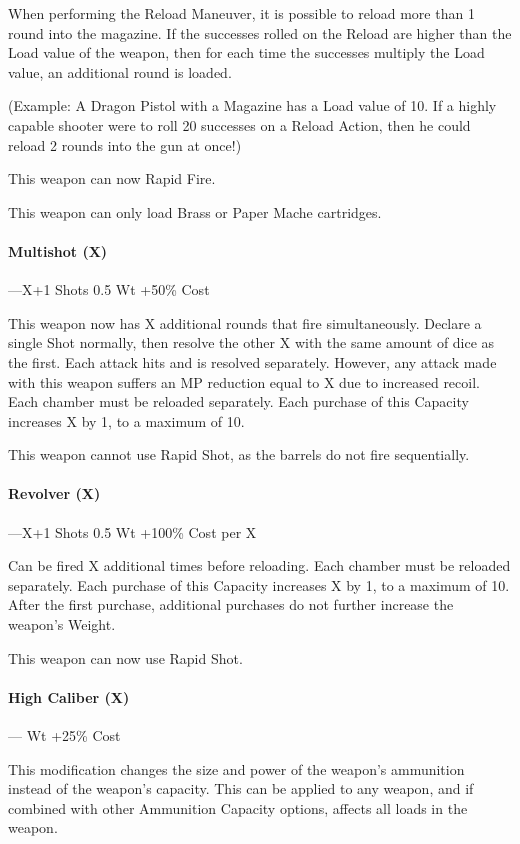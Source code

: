 \documentclass[oneside,11pt,english]{book}
\begin{document}
When performing the Reload Maneuver, it is possible to reload more than 1 round into the magazine. If the successes rolled on the Reload are higher than the Load value of the weapon, then for each time the successes multiply the Load value, an additional round is loaded.

(Example: A Dragon Pistol with a Magazine has a Load value of 10. If a highly capable shooter were to roll 20 successes on a Reload Action, then he could reload 2 rounds into the gun at once!)

This weapon can now Rapid Fire.

This weapon can only load Brass or Paper Mache cartridges.

\paragraph{Multishot (X)}---\quad X+1 Shots 0.5 Wt +50\% Cost

This weapon now has X additional rounds that fire simultaneously. Declare a single Shot normally, then resolve the other X with the same amount of dice as the first.
Each attack hits and is resolved separately. However, any attack made with this weapon suffers an MP reduction equal to X due to increased recoil. Each chamber must be reloaded separately. Each purchase of this Capacity increases X by 1, to a maximum of 10.

This weapon cannot use Rapid Shot, as the barrels do not fire sequentially. 

\paragraph{Revolver (X)}---\quad X+1 Shots 0.5 Wt +100\% Cost per X

Can be fired X additional times before reloading. Each chamber must be reloaded separately. Each purchase of this Capacity increases X by 1, to a maximum of 10. 
After the first purchase, additional purchases do not further increase the weapon’s Weight. 

This weapon can now use Rapid Shot. 

\paragraph{High Caliber (X)}--- Wt +25\% Cost

This modification changes the size and power of the weapon’s ammunition instead of the weapon’s capacity. This can be applied to any weapon, and if combined with other Ammunition Capacity options, affects all loads in the weapon.
\end{document}

